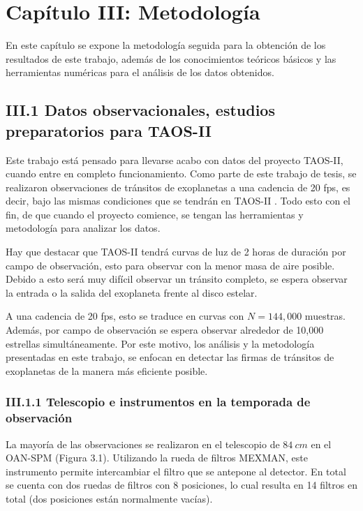 \chapter*{\textbf{Capítulo III: Metodología}}
\setcounter{chapter}{3}

En este capítulo se expone la metodología seguida para la obtención de los resultados de este trabajo, adem\'as de los conocimientos teóricos básicos y las herramientas numéricas para el análisis de los datos obtenidos.


\section*{III.1 Datos observacionales, estudios preparatorios para TAOS-II}

Este trabajo está pensado para llevarse acabo con datos del proyecto TAOS-II, cuando entre en completo funcionamiento. Como parte de este trabajo de tesis, se realizaron observaciones de tránsitos de exoplanetas a una cadencia de 20 fps, es decir, bajo las mismas condiciones que se tendrán en TAOS-II \cite{lehner2012transneptunian}. Todo esto con el fin, de que cuando el proyecto comience, se tengan las herramientas y metodología para analizar los datos.

Hay que destacar que TAOS-II tendrá curvas de luz de 2 horas de duraci\'on por campo de observación, esto para observar con la menor masa de aire posible. Debido a esto será muy difícil observar un tránsito completo, se espera observar la entrada o la salida del exoplaneta frente al disco estelar. 

A una cadencia de 20 fps, esto se traduce en curvas con $N=144,000$ muestras. Además, por campo de observación se espera observar alrededor de 10,000 estrellas simultáneamente. Por este motivo, los análisis y la metodología presentadas en este trabajo, se enfocan en detectar las firmas de tránsitos de exoplanetas de la manera más eficiente posible.

\subsection*{III.1.1 Telescopio e instrumentos en la temporada de observación}

La mayoría de las observaciones se realizaron en el telescopio de $84~cm$ en el OAN-SPM (Figura 3.1). Utilizando la rueda de filtros MEXMAN, este instrumento permite intercambiar el filtro que se antepone al detector. En total se cuenta con dos ruedas de filtros con 8 posiciones, lo cual resulta en 14 filtros en total (dos posiciones están normalmente vacías). 

